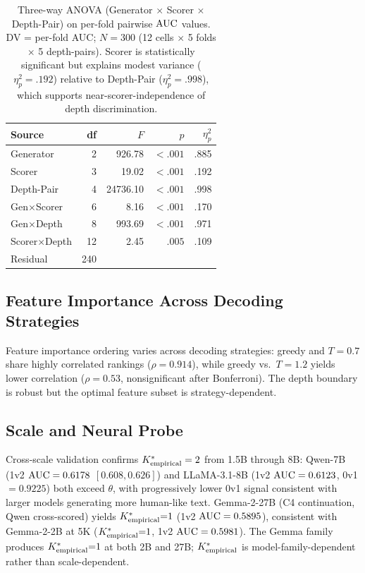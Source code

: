 \begin{table}[h]
\centering
\small
\caption{Three-way ANOVA (Generator $\times$ Scorer $\times$ Depth-Pair) on per-fold pairwise $\text{AUC}$ values. DV = per-fold AUC; $N{=}300$ (12 cells $\times$ 5 folds $\times$ 5 depth-pairs). Scorer is statistically significant but explains modest variance ($\eta^2_p{=}.192$) relative to Depth-Pair ($\eta^2_p{=}.998$), which supports near-scorer-independence of depth discrimination.}
\label{tab:anova_crossscorer}
\begin{tabular}{lrrrr}
\toprule
\textbf{Source} & \textbf{df} & $F$ & $p$ & $\eta^2_p$ \\
\midrule
Generator     & 2  & 926.78  & ${<}.001$  & .885 \\
Scorer        & 3  & 19.02  & ${<}.001$  & .192 \\
Depth-Pair    & 4  & 24736.10  & ${<}.001$  & .998 \\
Gen$\times$Scorer & 6 & 8.16 & ${<}.001$ & .170 \\
Gen$\times$Depth  & 8 & 993.69 & ${<}.001$ & .971 \\
Scorer$\times$Depth & 12 & 2.45 & $.005$ & .109 \\
Residual      & 240 & & & \\
\bottomrule
\end{tabular}
\end{table}

\subsection{Feature Importance Across Decoding Strategies}

Feature importance ordering varies across decoding strategies: greedy and $T{=}0.7$ share highly correlated rankings ($\rho = 0.914$), while greedy vs.\ $T{=}1.2$ yields lower correlation ($\rho = 0.53$, nonsignificant after Bonferroni).
The depth boundary is robust but the optimal feature subset is strategy-dependent.

\subsection{Scale and Neural Probe}
\label{sec:extended_neural_probe}

Cross-scale validation confirms ${K^*_{\text{empirical}}} = 2$ from 1.5B through 8B: Qwen-7B (1v2 $\text{AUC} = 0.6178$ $[0.608, 0.626]$) and LLaMA-3.1-8B (1v2 $\text{AUC} = 0.6123$, 0v1 $= 0.9225$) both exceed $\theta$, with progressively lower 0v1 signal consistent with larger models generating more human-like text.
Gemma-2-27B (C4 continuation, Qwen cross-scored) yields ${K^*_{\text{empirical}}}{=}1$ (1v2 $\text{AUC} = 0.5895$), consistent with Gemma-2-2B at 5K (${K^*_{\text{empirical}}}{=}1$, 1v2 $\text{AUC} = 0.5981$). The Gemma family produces ${K^*_{\text{empirical}}}{=}1$ at both 2B and 27B; ${K^*_{\text{empirical}}}$ is model-family-dependent rather than scale-dependent.

